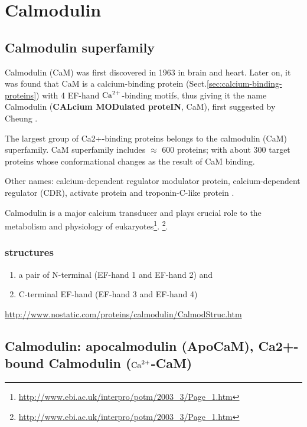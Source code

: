 
\chapter{Calmodulin}
\label{chap:calmodulin}


\section{Calmodulin superfamily}

Calmodulin (CaM) was first discovered in 1963 in brain and heart.
Later on, it was found that CaM is a calcium-binding protein
(Sect.\ref{sec:calcium-binding-proteins}) with 4 EF-hand ${\text{Ca}^{2+}}$-binding motifs,
thus giving it the name Calmodulin ({\bf CALcium MODulated proteIN}, CaM), first
suggested by Cheung \citep{cheung1970, cheung1980}. 


The largest group of
Ca2+-binding proteins belongs to the calmodulin (CaM) superfamily. CaM
superfamily includes $\approx$ 600 proteins; with about 300 target proteins
whose conformational changes as the result of CaM binding.


\begin{mdframed}
Other names:
calcium-dependent regulator modulator protein, calcium-dependent regulator
(CDR), activate protein and troponin-C-like protein \citep{jurado1999la}.

\end{mdframed}



Calmodulin is a major calcium transducer and plays crucial role to the
metabolism and physiology of
eukaryotes\footnote{\url{http://www.ebi.ac.uk/interpro/potm/2003_3/Page_1.htm}}.
\footnote{\url{http://www.ebi.ac.uk/interpro/potm/2003_3/Page_1.htm}}.

\subsection{structures}

\begin{enumerate}
  \item  a pair of N-terminal (EF-hand 1 and EF-hand 2) and 
  
  \item C-terminal EF-hand (EF-hand 3 and EF-hand 4)
\end{enumerate}

\url{http://www.nostatic.com/proteins/calmodulin/CalmodStruc.htm}


\section{Calmodulin: apocalmodulin (ApoCaM), Ca2+-bound Calmodulin (${\text{Ca}^{2+}}$-CaM)}
\label{sec:calmodulin_extension}
\label{sec:calmodulin}

